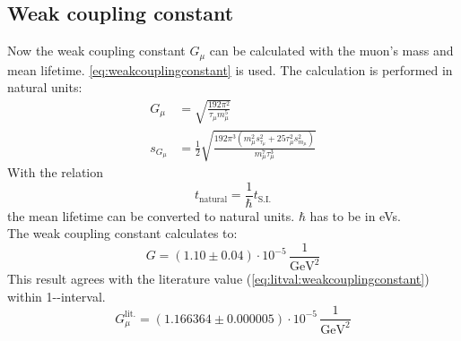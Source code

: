\subsection{Weak coupling constant}
Now the weak coupling constant $G_\mu$ can be calculated with the muon's mass and mean lifetime. \autoref{eq:weakcouplingconstant} is used. The 
calculation is performed in natural units:
\begin{equation}
    \begin{split}
        G_\mu &= \sqrt{\frac{192 \pi^2}{\tau_\mu m_\mu^5}} \\
        s_{G_\mu} &= \frac{1}{2} \sqrt{\frac{192 \pi^3 \left( m_\mu^2 s_{\tau_\mu}^2 + 25 \tau_\mu^2 s_{m_\mu}^2 \right)}{m_\mu^7 \tau_\mu^3}}
    \end{split}
\end{equation}
With the relation
\begin{equation}
    t_\text{natural} = \frac{1}{\hbar} t_\text{S.I.}
\end{equation}
the mean lifetime can be converted to natural units. $\hbar$ has to be in eVs. \\
The weak coupling constant calculates to:
\begin{equation}
    G = (1.10 \pm 0.04) \cdot 10^{-5}\,\frac{1}{\text{GeV}^2}
\end{equation}
This result agrees with the literature value (\autoref{eq:litval:weakcouplingconstant}) within 1-\textsigma-interval.
\begin{equation}
    G_\mu^{\text{lit.}} = \left( 1.166364 \pm 0.000005 \right) \cdot 10^{-5}\,\frac{1}{\text{GeV}^2}
\end{equation}